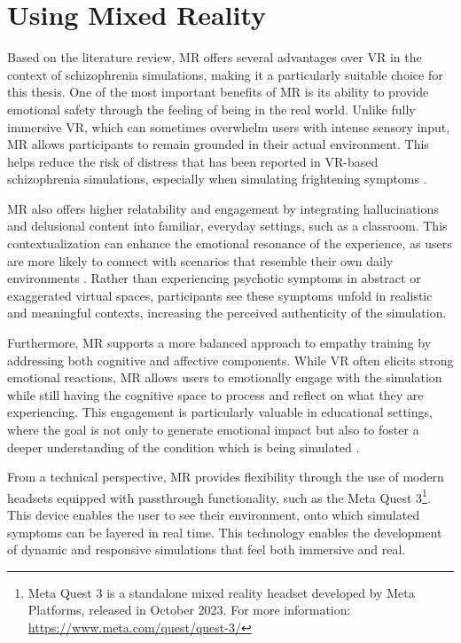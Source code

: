 \section{Using Mixed Reality}

Based on the literature review, MR offers several advantages over VR in the context of schizophrenia simulations, making it a particularly suitable choice for this thesis. One of the most important benefits of MR is its ability to provide emotional safety through the feeling of being in the real world. Unlike fully immersive VR, which can sometimes overwhelm users with intense sensory input, MR allows participants to remain grounded in their actual environment. This helps reduce the risk of distress that has been reported in VR-based schizophrenia simulations, especially when simulating frightening symptoms \cite{Zare-Bidaki2022}.

MR also offers higher relatability and engagement by integrating hallucinations and delusional content into familiar, everyday settings, such as a classroom. This contextualization can enhance the emotional resonance of the experience, as users are more likely to connect with scenarios that resemble their own daily environments \cite{Krogmeier2024}. Rather than experiencing psychotic symptoms in abstract or exaggerated virtual spaces, participants see these symptoms unfold in realistic and meaningful contexts, increasing the perceived authenticity of the simulation.

\vspace{1em}

Furthermore, MR supports a more balanced approach to empathy training by addressing both cognitive and affective components. While VR often elicits strong emotional reactions, MR allows users to emotionally engage with the simulation while still having the cognitive space to process and reflect on what they are experiencing. This engagement is particularly valuable in educational settings, where the goal is not only to generate emotional impact but also to foster a deeper understanding of the condition which is being simulated \cite{Martingano2021, Rueda2020}.

From a technical perspective, MR provides flexibility through the use of modern headsets equipped with passthrough functionality, such as the Meta Quest 3\footnote{Meta Quest 3 is a standalone mixed reality headset developed by Meta Platforms, released in October 2023. For more information: \url{https://www.meta.com/quest/quest-3/}}.
This device enables the user to see their environment, onto which simulated symptoms can be layered in real time. This technology enables the development of dynamic and responsive simulations that feel both immersive and real.


